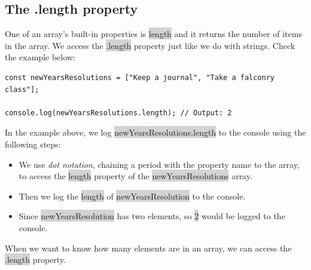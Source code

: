 \documentclass[11pt]{article}
\begin{document}
\subsection{The .length property}
One of an array’s built-in properties is \colorbox{lightgray}{length} and it returns the number of items in the array. We access the \colorbox{lightgray}{.length} property just like we do with strings. Check the example below: 
\begin{lstlisting}
const newYearsResolutions = ["Keep a journal", "Take a falconry class"];

console.log(newYearsResolutions.length); // Output: 2
\end{lstlisting}
In the example above, we log \colorbox{lightgray}{newYearsResolutions.length} to the console using the following steps:
\begin{itemize}[leftmargin = *]
\item We use \textit{dot notation}, chaining a period with the property name to the array, to access the \colorbox{lightgray}{length} property of the \colorbox{lightgray}{newYearsResolutions} array.
\item Then we log the \colorbox{lightgray}{length} of \colorbox{lightgray}{newYearsResolution} to the console.
\item Since \colorbox{lightgray}{newYearsResolution} has two elements, so \colorbox{lightgray}{2} would be logged to the console.
\end{itemize}
When we want to know how many elements are in an array, we can access the \colorbox{lightgray}{.length} property.
\end{document}
